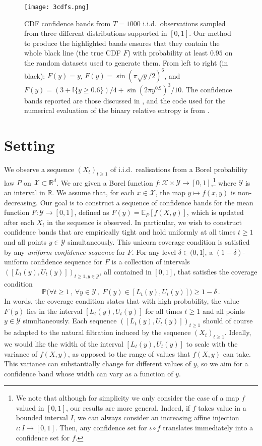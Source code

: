 \documentclass[3p, authoryear, 10pt]{elsarticle}%
\newcommand{\E}{\mathbb E}
\newcommand{\R}{\mathbb R}
\newcommand{\X}{\mathcal X}
\newcommand{\Y}{\mathcal Y}
\begin{document}
\begin{figure}[t!]
    \centering
    \texttt{[image: 3cdfs.png]}
    \caption{CDF confidence bands from $T=1000$ i.i.d.~observations sampled from three different distributions supported in $[0,1]$. Our method to produce the highlighted bands ensures that they contain the whole black line (the true CDF $F$) with probability at least $0.95$ on the random datasets used to generate them. From left to right (in black): $F(y)=y$, $F(y)=\sin(\pi\sqrt{y}/2)^6$, and $F(y)=(3 + \mathbb{I}\{y\geq0.6\})/4 + \sin(2\pi y^{0.9})^3/10$. The confidence bands reported are those discussed in , and the code used for the numerical evaluation of the binary relative entropy is from \cite{clerico2022conditionally}.}
    \label{fig:3cdfs}
\end{figure}
%
\section{Setting}

We observe a sequence $(X_t)_{t\geq 1}$ of i.i.d.\ realisations from a Borel probability law $P$ on $\X \subset \R^d$. We are given a Borel function $f: \X \times \Y \to [0,1]$,\footnote{We note that although for simplicity we only consider the case of a map $f$ valued in $[0,1]$, our results are more general. Indeed, if $f$ takes value in a bounded interval $I$, we can always consider an increasing affine injection $\iota:I\to[0,1]$. Then, any confidence set for $\iota\circ f$ translates immediately into a confidence set for $f$.} where $\Y$ is an interval in $\R$. We assume that, for each $x \in \X$, the map $y \mapsto f(x,y)$ is non-decreasing. Our goal is to construct a sequence of confidence bands for the mean function $F: \Y \to [0,1]$, defined as $F(y) = \E_P[f(X,y)]$, which is updated after each $X_t$ in the sequence is observed. In particular, we wish to construct confidence bands that are empirically tight and hold uniformly at all times $t \geq 1$ and all points $y \in \Y$ simultaneously. This unicorn coverage condition is satisfied by any \emph{uniform confidence sequence} for $F$. For any level $\delta \in (0, 1]$, a $(1-\delta)$-uniform confidence sequence for $F$ is a collection of intervals $([L_t(y), U_t(y)])_{t\geq 1,y\in\Y}$, all contained in $[0,1]$, that satisfies the coverage condition
\begin{equation*}
\mathbb P\Big(\forall t \geq 1\,,\,\forall y \in \Y\,,\;F(y) \in [L_t(y), U_t(y)]\Big) \geq 1 - \delta\,.%
\end{equation*}
In words, the coverage condition states that with high probability, the value $F(y)$ lies in the interval $[L_t(y), U_t(y)]$ for all times $t \geq 1$ and all points $y \in \Y$ simultaneously. Each sequence $([L_t(y), U_t(y)])_{t \geq 1}$ should of course be adapted to the natural filtration induced by the sequence $(X_t)_{t\geq 1}$. Ideally, we would like the width of the interval $[L_t(y), U_t(y)]$ to scale with the variance of $f(X,y)$, as opposed to the range of values that $f(X,y)$ can take. This variance can substantially change for different values of $y$, so we aim for a confidence band whose width can vary as a function of $y$. 
\end{document}
